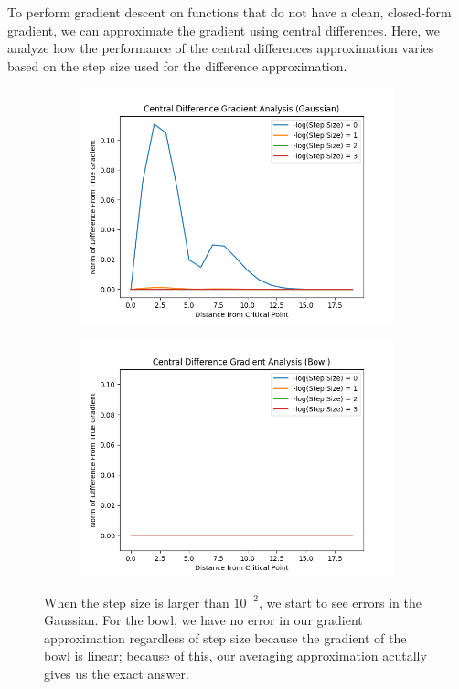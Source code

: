 \documentclass{article}
\begin{document}
To perform gradient descent on functions that do not have a clean, closed-form gradient, we can approximate the gradient using central differences. Here, we analyze how the performance of the central differences approximation varies based on the step size used for the difference approximation.

\begin{figure}[H]
\centering
        \begin{subfigure}[b]{0.4\textwidth}
                \includegraphics[width=\linewidth]{../P1/figs/central_diff_gauss.png}
        \end{subfigure}%
        \begin{subfigure}[b]{0.4\textwidth}
                \includegraphics[width=\linewidth]{../P1/figs/central_diff_bowl.png}
        \end{subfigure}%
\caption*{When the step size is larger than $10^{-2}$, we start to see errors in the Gaussian. For the bowl, we have no error in our gradient approximation regardless of step size because the gradient of the bowl is linear; because of this, our averaging approximation acutally gives us the exact answer. }
\end{figure}
\end{document}
